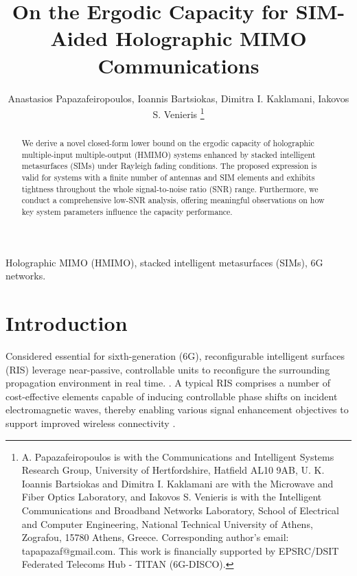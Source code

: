 \documentclass[twocolumn,10pt]{IEEEtran}
\begin{document}
	\title{On the Ergodic Capacity  for SIM-Aided Holographic MIMO Communications} 
	\author{Anastasios Papazafeiropoulos, Ioannis Bartsiokas,  Dimitra I. Kaklamani, 			Iakovos S. Venieris \thanks{A. Papazafeiropoulos is with the Communications and Intelligent Systems Research Group, University of Hertfordshire, Hatfield AL10 9AB, U. K. Ioannis Bartsiokas and  Dimitra I. Kaklamani are with the Microwave and Fiber Optics Laboratory, and Iakovos S. Venieris is  with the Intelligent Communications and Broadband Networks Laboratory, School of Electrical and Computer Engineering, National Technical University of Athens, Zografou, 15780 Athens,	Greece.	
			Corresponding author's email: tapapazaf@gmail.com. This work is financially supported by EPSRC/DSIT Federated Telecoms Hub - TITAN (6G-DISCO).}}
	\maketitle\vspace{-1.7cm}
	
	\maketitle
	\begin{abstract}	
		We derive a novel closed-form lower bound on the ergodic capacity of holographic multiple-input multiple-output (HMIMO) systems enhanced by stacked intelligent metasurfaces (SIMs) under Rayleigh fading conditions. The proposed expression is valid for systems with a finite number of antennas and SIM elements and exhibits tightness throughout the whole signal-to-noise ratio (SNR) range. 	Furthermore, we conduct a comprehensive low-SNR analysis, offering meaningful observations  on how key system parameters influence the capacity performance.
	\end{abstract}
	
	\begin{keywords}
	Holographic MIMO (HMIMO), 	stacked intelligent metasurfaces (SIMs),  6G networks.
	\end{keywords}
	
	\section{Introduction}
Considered essential for sixth-generation (6G), reconfigurable intelligent surfaces (RIS) leverage near-passive, controllable units to reconfigure the surrounding propagation environment in real time. \cite{DiRenzo2020,Papazafeiropoulos2021}. A typical RIS comprises a  number of cost-effective elements capable of inducing controllable phase shifts on incident electromagnetic waves, thereby enabling various signal enhancement objectives to support improved wireless connectivity \cite{DiRenzo2020}.
	
\end{document}
